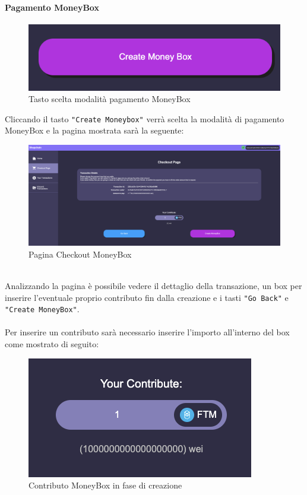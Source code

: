             \paragraph{Pagamento MoneyBox}
            \begin{figure}[H]
                \centering
                \includegraphics[scale=0.3]{immagini/Checkout/CreateMoneyBox.png}
                \caption{Tasto scelta modalità pagamento MoneyBox}
            \end{figure}
            Cliccando il tasto \texttt{"Create Moneybox"} verrà scelta la modalità di pagamento MoneyBox e la pagina mostrata sarà la seguente:
            \begin{figure}[H]
                \centering
                \includegraphics[scale=0.2]{immagini/Checkout/MoneyBoxCheckout.png}
                \caption{Pagina Checkout MoneyBox}
            \end{figure}
            \textbf{}\\
            Analizzando la pagina è possibile vedere il dettaglio della transazione, un box per inserire l'eventuale proprio contributo fin dalla creazione e i tasti \texttt{"Go Back"} e \texttt{"Create MoneyBox"}.\\\\
            Per inserire un contributo sarà necessario inserire l'importo all'interno del box come mostrato di seguito:
            \begin{figure}[H]
                \centering
                \includegraphics[scale=0.4]{immagini/Checkout/InitialContribute.png}
                \caption{Contributo MoneyBox in fase di creazione}
            \end{figure}
